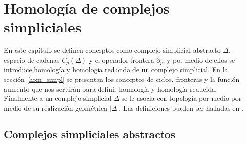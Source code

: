 \documentclass[12pt]{book}
\theoremstyle{definition}
\newtheorem{lemma}[theorem]{Lema}
\newcounter{in}
\newcounter{ini}
\newcommand{\rep}{A}
\begin{document}



\chapter{Homología de complejos simpliciales}
\label{hsc}

En este capítulo se definen conceptos como
complejo simplicial abstracto $\Delta$, espacio de cadenas
$C_{p}(\Delta)$ y el operador frontera $\partial_{p}$, y por medio de
ellos se introduce homología y homología reducida de un complejo
simplicial. En la sección \ref{hom_simpl} se presentan los conceptos
de ciclos, fronteras y la función aumento que nos servirán para
definir homología y homología reducida. Finalmente a un complejo
simplicial $\Delta$ se le asocia con topología por medio por medio
de su realización geométrica $|\Delta|$. Las definiciones pueden ser halladas en \cite{munkres1984elements}.

\section{Complejos simpliciales abstractos}
\label{asc}
\end{document}
